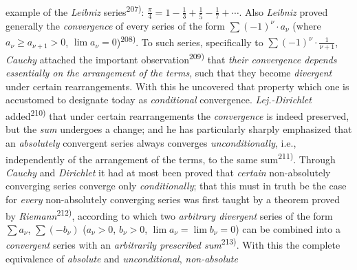 \thispagestyle{fancy}

\vspace{0.5cm}

example of the \textit{Leibniz} series\textsuperscript{207)}: $\frac{\pi}{4} = 1 - \frac{1}{3} + \frac{1}{5} - \frac{1}{7} + \cdots$. Also \textit{Leibniz} proved generally the \textit{convergence} of every series of the form $\sum (-1)^\nu \cdot a_\nu$ (where $a_\nu \geq a_{\nu+1} > 0$, $\lim a_\nu = 0$)\textsuperscript{208)}. To such series, specifically to $\sum (-1)^\nu \cdot \frac{1}{\nu + 1}$, \textit{Cauchy} attached the important observation\textsuperscript{209)} that \textit{their convergence depends essentially on the arrangement of the terms}, such that they become \textit{divergent} under certain rearrangements. With this he uncovered that property which one is accustomed to designate today as \textit{conditional} convergence. \textit{Lej.-Dirichlet} added\textsuperscript{210)} that under certain rearrangements the \textit{convergence} is indeed preserved, but the \textit{sum} undergoes a change; and he has particularly sharply emphasized that an \textit{absolutely} convergent series always converges \textit{unconditionally}, i.e., independently of the arrangement of the terms, to the same sum\textsuperscript{211)}. Through \textit{Cauchy} and \textit{Dirichlet} it had at most been proved that \textit{certain} non-absolutely converging series converge only \textit{conditionally}; that this must in truth be the case for \textit{every} non-absolutely converging series was first taught by a theorem proved by \textit{Riemann}\textsuperscript{212)}, according to which two \textit{arbitrary divergent} series of the form $\sum a_\nu$, $\sum (-b_\nu)$ ($a_\nu > 0$, $b_\nu > 0$, $\lim a_\nu = \lim b_\nu = 0$) can be combined into a \textit{convergent} series with an \textit{arbitrarily prescribed sum}\textsuperscript{213)}. With this the complete equivalence of \textit{absolute} and \textit{unconditional}, \textit{non-absolute}

